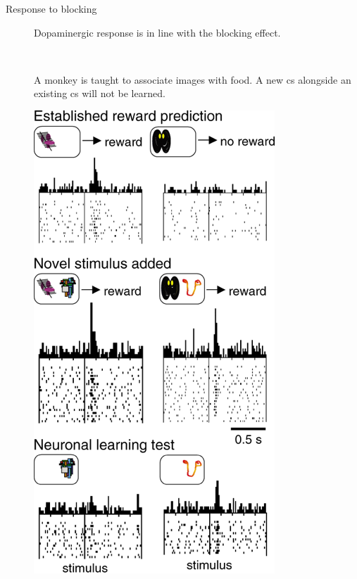 \begin{description}
    \item[Response to blocking] 
        Dopaminergic response is in line with the blocking effect.

        \begin{@empty}
            \small
            \begin{example}
                \phantom{}\\
                \begin{minipage}{0.7\linewidth}
                    A monkey is taught to associate images with food.
                    A new \ac{cs} alongside an existing \ac{cs} will not be learned.
                \end{minipage}
                \begin{minipage}{0.28\linewidth}
                    \centering
                    \includegraphics[width=\linewidth]{./img/dopamine_blocking.png}

\end{minipage}
\end{example}
\end{@empty}
\end{description}
